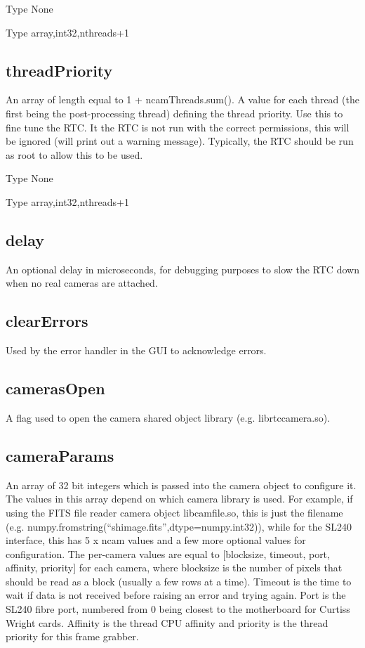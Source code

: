 \documentclass[a4,10pt]{article}
\begin{document}
Type None

Type array,int32,nthreads+1

\subsection{threadPriority}
An array of length equal to 1 + ncamThreads.sum().  A value for each
thread (the first being the post-processing thread) defining the
thread priority.  Use this to fine tune the RTC.  It the RTC is not
run with the correct permissions, this will be ignored (will print
out a warning message).  Typically, the RTC should be run as root to
allow this to be used.

Type None

Type array,int32,nthreads+1



\subsection{delay}
An optional delay in microseconds, for debugging purposes to slow the
RTC down when no real cameras are attached.

\subsection{clearErrors}
Used by the error handler in the GUI to acknowledge errors.

\subsection{camerasOpen}
A flag used to open the camera shared object library
(e.g. librtccamera.so).  

\subsection{cameraParams}
An array of 32 bit integers which is passed into the camera object to
configure it.  The values in this array depend on which camera library
is used.  For example, if using the FITS file reader camera object
libcamfile.so, this is just the filename
(e.g. numpy.fromstring(``shimage.fits'',dtype=numpy.int32)), while for
the SL240 interface, this has 5 x ncam values and a few more optional
values for configuration.  The per-camera values are equal to
[blocksize, timeout, port, affinity, priority] for each camera, where
blocksize is the number of pixels that should be read as a block
(usually a few rows at a time).  Timeout is the time to wait if data
is not received before raising an error and trying again.  Port is the
SL240 fibre port, numbered from 0 being closest to the motherboard for
Curtiss Wright cards.  Affinity is the thread CPU affinity and
priority is the thread priority for this frame grabber.
\end{document}
